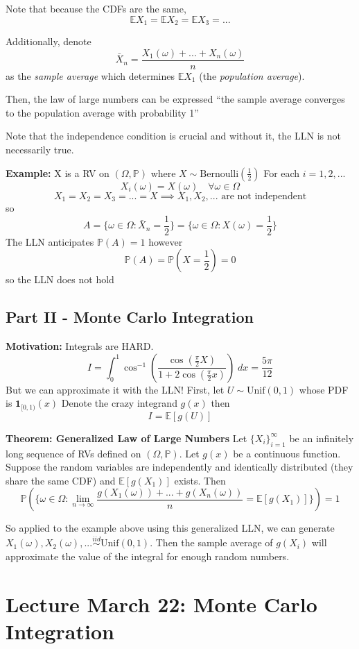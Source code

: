 \documentclass[12pt]{article}
\renewcommand{\P}{\mathbb{P}}
\newcommand{\E}{\mathbb{E}}
\begin{document}
Note that because the CDFs are the same,
\[\E X_1 = \E X_2 = \E X_3 = ...\]

Additionally, denote 
\[\bar{X}_n = \frac{X_1(\omega) + ... + X_n(\omega)}{n}\]
as the \emph{sample average} which determines $\E X_1$ (the \emph{population average}).

Then, the law of large numbers can be expressed ``the sample average converges to the population average with probability 1''

Note that the independence condition is crucial and without it, the LLN is not necessarily true.

\textbf{Example:} 
X is a RV on $(\Omega, \P)$ where $X \sim \text{Bernoulli}(\frac{1}{2})$ 
For each $i = 1, 2, ...$
\[X_i(\omega) = X(\omega) \quad \forall \omega \in \Omega\]
\[X_1 = X_2 = X_3 = ... = X \implies X_1, X_2, ... \text{ are not independent}\]
so 
\[A = \{\omega \in \Omega : \bar{X}_n = \frac{1}{2}\} = \{\omega \in \Omega : X(\omega) = \frac{1}{2}\}\]
The LLN anticipates $\P(A) = 1$ however 
\[\P(A) = \P(X = \frac{1}{2}) = 0\]
so the LLN does not hold 

\subsection*{Part II - Monte Carlo Integration}
\textbf{Motivation:} Integrals are HARD. 
\[I = \int_0^1 \cos^{-1}\left(\frac{\cos(\frac{\pi}{2}X)}{1 + 2\cos(\frac{\pi}{2}x)}\right)\; dx = \frac{5\pi}{12}\]
But we can approximate it with the LLN!
First, let $U \sim \text{Unif}(0, 1)$ whose PDF is $\mathbf{1}_{[0, 1)}(x)$
Denote the crazy integrand $g(x)$ then 
\[I = \E [g(U)]\]

\textbf{Theorem: Generalized Law of Large Numbers}
Let $\{X_i\}_{i=1}^\infty$ be an infinitely long sequence of RVs defined on $(\Omega, \P)$. Let $g(x)$ be a continuous function. Suppose the random variables are independently and identically distributed (they share the same CDF) and $\E[g(X_1)]$ exists. Then 
\[\P\left(\{\omega \in \Omega : \lim_{n \to \infty} \frac{g(X_1(\omega)) + ... + g(X_n(\omega))}{n} = \E[g(X_1)]\}\right) = 1\]

So applied to the example above using this generalized LLN, we can generate $X_1(\omega), X_2(\omega), ... \overset{iid}{\sim} \text{Unif}(0, 1)$. Then the sample average of $g(X_i)$ will approximate the value of the integral for enough random numbers. 

\section*{Lecture March 22: Monte Carlo Integration}
\end{document}
